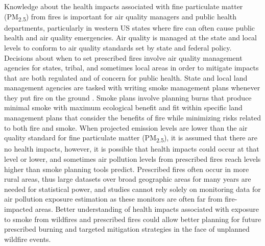 \documentclass[authoryear]{elsarticle}
\begin{document}
Knowledge about the health impacts associated with fine particulate matter (PM\textsubscript{2.5}) from fires is important for air quality managers and  public health departments, particularly in western US states where fire can often cause public health and air quality emergencies. 
Air quality is managed at the state and local levels to conform to air quality standards set by state and federal policy.
Decisions about when to set prescribed fires involve air quality management agencies for states, tribal, and sometimes local areas in order to mitigate impacts that are both regulated and of concern for public health. 
State and local land management agencies are tasked with writing smoke management plans whenever they put fire on the ground \citep{SmokeManagement2001}. %
Smoke plans involve planning burns that produce minimal smoke with maximum ecological benefit and fit within specific land management plans that consider the benefits of fire while minimizing risks related to both fire and smoke. %
When projected emission levels are lower than the air quality standard for fine particulate matter (PM\textsubscript{2.5}), it is assumed that there are no health impacts, however, it is possible that health impacts could occur at that level or lower, and sometimes air pollution levels from prescribed fires reach levels higher than smoke planning tools predict.
Prescribed fires often occur in more rural areas, thus large datasets over broad geographic areas for many years are needed for statistical power, and studies cannot rely solely on monitoring data for air pollution exposure estimation as these monitors are often far from fire-impacted areas.
Better understanding of health impacts associated with exposure to smoke from wildfires and prescribed fires could allow better planning for future prescribed burning and targeted mitigation strategies in the face of unplanned wildfire events.
\end{document}
